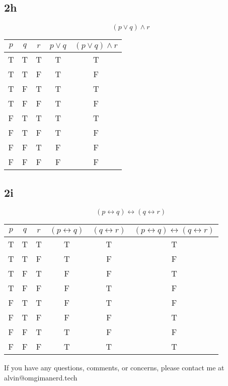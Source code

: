\documentclass{math}
\begin{document}
\subsection*{2h}
\[ (p \vee q) \wedge r \]
\begin{center}
  \begin{tabular}{|c|c|c|c|c|}
    \hline
    \( p \) & \( q \) & \( r \) & \( p \vee q \) & \( (p \vee q) \wedge r \)
        \\ \hline
    T & T & T & T & T \\ \hline
    T & T & F & T & F \\ \hline
    T & F & T & T & T \\ \hline
    T & F & F & T & F \\ \hline
    F & T & T & T & T \\ \hline
    F & T & F & T & F \\ \hline
    F & F & T & F & F \\ \hline
    F & F & F & F & F \\ \hline
  \end{tabular}
\end{center}

\subsection*{2i}
\[ (p \leftrightarrow q) \leftrightarrow (q \leftrightarrow r) \]
\begin{center}
  \begin{tabular}{|c|c|c|c|c|c|}
    \hline
    \( p \) & \( q \) & \( r \) & \( (p \leftrightarrow q) \) &
    \( (q \leftrightarrow r) \) &
    \( (p \leftrightarrow q) \leftrightarrow (q \leftrightarrow r) \) \\ \hline
    T & T & T & T & T & T \\ \hline
    T & T & F & T & F & F \\ \hline
    T & F & T & F & F & T \\ \hline
    T & F & F & F & T & F \\ \hline
    F & T & T & F & T & F \\ \hline
    F & T & F & F & F & T \\ \hline
    F & F & T & T & F & F \\ \hline
    F & F & F & T & T & T \\ \hline
  \end{tabular}
\end{center}

\begin{center}
  If you have any questions, comments, or concerns, please contact me at
  alvin@omgimanerd.tech
\end{center}
\end{document}

